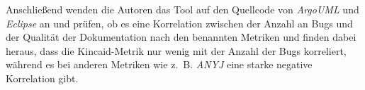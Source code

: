 Anschließend wenden die Autoren das Tool auf den Quellcode von \textit{ArgoUML} und \textit{Eclipse} an und prüfen, ob es eine Korrelation zwischen der Anzahl an Bugs und der Qualität der Dokumentation nach den benannten Metriken und finden dabei heraus, dass die Kincaid-Metrik nur wenig mit der Anzahl der Bugs korreliert, während es bei anderen Metriken wie z.~B. \textit{ANYJ} eine starke negative Korrelation gibt. 

